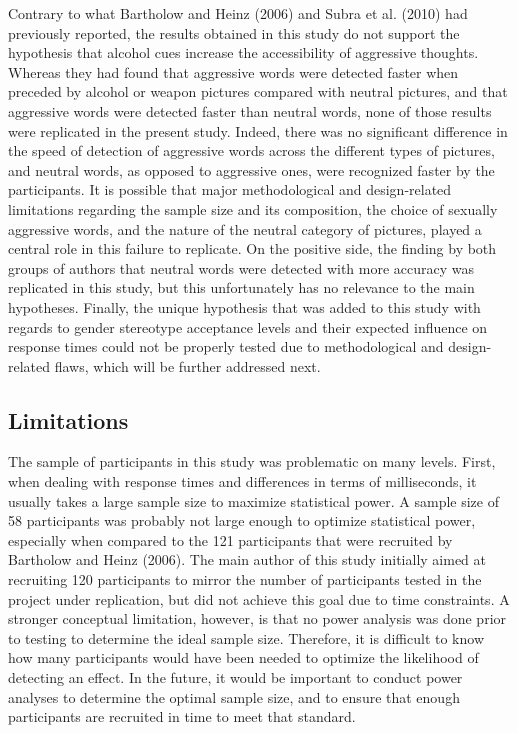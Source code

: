 \documentclass[authordate, serif, review]{jote-article}
\begin{document}
\begin{multicols}{2}
\noindent Contrary to what Bartholow and Heinz (2006) and Subra et al. (2010) had previously reported, the results obtained in this study do not support the hypothesis that alcohol cues increase the accessibility of aggressive thoughts. Whereas they had found that aggressive words were detected faster when preceded by alcohol or weapon pictures compared with neutral pictures, and that aggressive words were detected faster than neutral words, none of those results were replicated in the present study. Indeed, there was no significant difference in the speed of detection of aggressive words across the different types of pictures, and neutral words, as opposed to aggressive ones, were recognized faster by the participants. It is possible that major methodological and design-related limitations regarding the sample size and its composition, the choice of sexually aggressive words, and the nature of the neutral category of pictures, played a central role in this failure to replicate. On the positive side, the finding by both groups of authors that neutral words were detected with more accuracy was replicated in this study, but this unfortunately has no relevance to the main hypotheses. Finally, the unique hypothesis that was added to this study with regards to gender stereotype acceptance levels and their expected influence on response times could not be properly tested due to methodological and design-related flaws, which will be further addressed next. 

{}
\subsection*{Limitations}
The sample of participants in this study was problematic on many levels. First, when dealing with response times and differences in terms of milliseconds, it usually takes a large sample size to maximize statistical power. A sample size of 58 participants was probably not large enough to optimize statistical power, especially when compared to the 121 participants that were recruited by Bartholow and Heinz (2006). The main author of this study initially aimed at recruiting 120 participants to mirror the number of participants tested in the project under replication, but did not achieve this goal due to time constraints. A stronger conceptual limitation, however, is that no power analysis was done prior to testing to determine the ideal sample size. Therefore, it is difficult to know how many participants would have been needed to optimize the likelihood of detecting an effect. In the future, it would be important to conduct power analyses to determine the optimal sample size, and to ensure that enough participants are recruited in time to meet that standard. 


\end{multicols}
\end{document}

